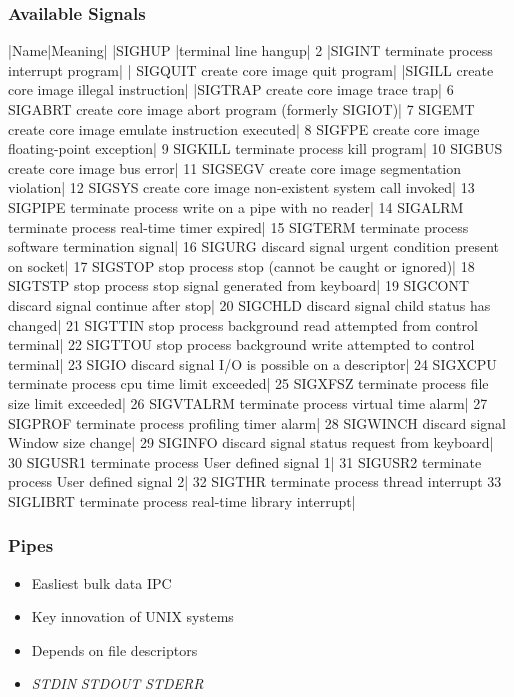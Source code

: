 \documentclass[pdftex]{beamer} %
\begin{document}
\begin{frame}
  \frametitle{Available Signals}
  \begin{tabular}
  |Name|Meaning|
  \hline
  |SIGHUP	|terminal line hangup|
     2	   |SIGINT	terminate process    interrupt program|
  | SIGQUIT	create core image    quit program|
  |SIGILL	create core image    illegal instruction|
  |SIGTRAP	create core image    trace trap|
     6	   SIGABRT	create core image    abort program (formerly SIGIOT)|
     7	   SIGEMT	create core image    emulate instruction executed|
     8	   SIGFPE	create core image    floating-point exception|
     9	   SIGKILL	terminate process    kill program|
     10	   SIGBUS	create core image    bus error|
     11	   SIGSEGV	create core image    segmentation violation|
     12	   SIGSYS	create core image    non-existent system call invoked|
     13	   SIGPIPE	terminate process    write on a	pipe with no reader|
     14	   SIGALRM	terminate process    real-time timer expired|
     15	   SIGTERM	terminate process    software termination signal|
     16	   SIGURG	discard	signal	     urgent condition present on  socket|
     17	   SIGSTOP	stop process	     stop (cannot be caught or ignored)|
     18	   SIGTSTP	stop process	     stop signal generated from  keyboard|
     19	   SIGCONT	discard	signal	     continue after stop|
     20	   SIGCHLD	discard	signal	     child status has changed|
     21	   SIGTTIN	stop process	     background	read attempted from control terminal|
     22	   SIGTTOU	stop process	     background	write attempted	to control terminal|
     23	   SIGIO	discard	signal	     I/O is possible on	a descriptor|
     24	   SIGXCPU	terminate process    cpu time limit exceeded|
     25	   SIGXFSZ	terminate process    file size limit exceeded|
     26	   SIGVTALRM	terminate process    virtual time alarm|
     27	   SIGPROF	terminate process    profiling timer alarm|
     28	   SIGWINCH	discard	signal	     Window size change|
     29	   SIGINFO	discard	signal	     status request from keyboard|
     30	   SIGUSR1	terminate process    User defined signal 1|
     31	   SIGUSR2	terminate process    User defined signal 2|
     32	   SIGTHR	terminate process    thread interrupt
     33	   SIGLIBRT	terminate process    real-time library interrupt|
  \end{tabular}
\end{frame}

\begin{frame}
  \frametitle{Pipes}
  \begin{itemize}
  \item Easliest bulk data IPC
  \item Key innovation of UNIX systems
  \item Depends on file descriptors
  \item \emph{STDIN} \emph{STDOUT} \emph{STDERR}
 \end{itemize}
\end{frame}
\end{document}
